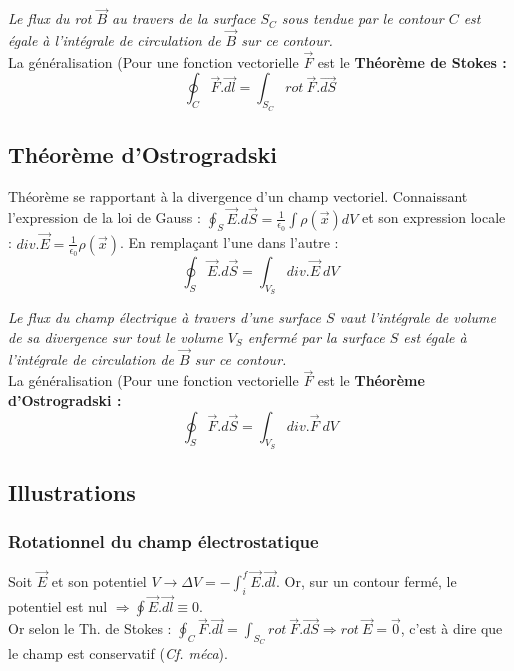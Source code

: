 \documentclass	[11pt, a4paper, openany]{book}
\begin{document}
\textit{Le flux du rot $\vec{B}$ au travers de la surface $S_C$ sous tendue par le contour $C$ est égale à l'intégrale de circulation de $\vec{B}$ sur ce contour.}\\
La généralisation (Pour une fonction vectorielle $\vec{F}$ est le \textbf{Théorème de Stokes :}
\begin{equation}
\oint_C \vec{F}.\vec{dl} = \int_{S_C} rot\ \vec{F}.\vec{dS}
\end{equation}


\subsection{Théorème d'Ostrogradski}
Théorème se rapportant à la divergence d'un champ vectoriel. Connaissant l'expression de la loi de Gauss : $\oint_S \vec{E}.d\vec{S} = \frac{1}{\epsilon_0} \int \rho(\vec{x})dV$ et son expression locale : $div.\vec{E} = \frac{1}{\epsilon_0}\rho(\vec{x})$. En remplaçant l'une dans l'autre : 
\begin{equation}
\oint_S \vec{E}.d\vec{S} = \int_{V_S} div.\vec{E}\ dV
\end{equation}

\textit{Le flux du champ électrique à travers d'une surface $S$ vaut l'intégrale de volume de sa divergence sur tout le volume $V_S$ enfermé par la surface $S$ est égale à l'intégrale de circulation de $\vec{B}$ sur ce contour.}\\

La généralisation (Pour une fonction vectorielle $\vec{F}$ est le \textbf{Théorème d'Ostrogradski :}
\begin{equation}
\oint_S \vec{F}.d\vec{S} = \int_{V_S} div.\vec{F}\ dV
\end{equation}

\subsection{Illustrations}
\subsubsection{Rotationnel du champ électrostatique}
Soit $\vec{E}$ et son potentiel $V \rightarrow \Delta V = - \int_i^f \vec{E}.\vec{dl}$. Or, sur un contour fermé, le potentiel est nul $\Rightarrow \oint \vec{E}.\vec{dl} \equiv 0$.\\

Or selon le Th. de Stokes : $\oint_C \vec{F}.\vec{dl} = \int_{S_C} rot\ \vec{F}.\vec{dS} \Rightarrow rot\ \vec{E} = \vec{0}$, c'est à dire que le champ est conservatif (\textit{Cf. méca}).
\end{document}
